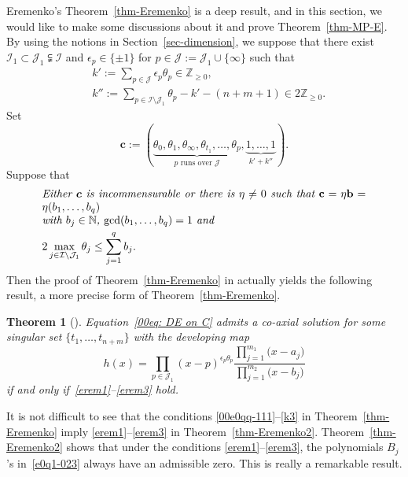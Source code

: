 \documentclass[10pt,a4paper]{amsart}
\numberwithin{equation}{section}
\newtheorem{Theorem}{Theorem}[section]
\begin{document}
Eremenko's Theorem~\ref{thm-Eremenko} is a deep result, and in this section, we would like to make some discussions about it and prove Theorem~\ref{thm-MP-E}.
By using the notions in Section~\ref{sec-dimension}, we suppose that there exist $\mathcal{I}_1\subset \mathcal{J}_1\subsetneqq \mathcal{I}$ and $\epsilon_p\in\{\pm 1\}$ for $p\in\mathcal{J}:=\mathcal{J}_1\cup\{\infty\}$ such that
\begin{align}\label{erem1}
&k':=\sum_{p\in\mathcal{J}}\epsilon_p \theta_p\in\mathbb{Z}_{\geq 0},\\
\label{erem2}
&k'':=\sum_{p\in\mathcal{I}\setminus\mathcal{J}_1}\theta_p-k'-(n+m+1)\in 2\mathbb{Z}_{\geq 0}.
\end{align}
Set
\[
 \boldsymbol c:=(\underbrace{\theta_0,\theta_1,\theta_\infty,
 \theta_{t_1},\dots,\theta_{p}}
 _{p\text{ runs over }\mathcal{J}},\underbrace{1,\dots,1}_{k'+k''}).
\]
Suppose that
\begin{equation} \label{erem3}
\begin{aligned}
& \parbox{\dimexpr\linewidth-5em}{\it
 Either $\boldsymbol c$ is incommensurable or there is $\eta\neq0$
 such that $\mathbf{c}=\eta\mathbf{b}=\eta(b_1,\dots,b_q)$\\ with
 $b_j\in\mathbb{N}$, $\gcd (b_1,\dots,b_q)=1$ and}
\\
& 2\max_{j\in\mathcal{I}\setminus\mathcal{J}_1}\theta_j\leq \sum_{j=1}^q b_j.
\end{aligned}
\end{equation}
Then the proof of Theorem~\ref{thm-Eremenko} in \cite{Coaxial} actually yields the following result, a more precise form of Theorem~\ref{thm-Eremenko}.

\begin{Theorem}[{\cite{Coaxial}\label{thm-Eremenko2}}]
Equation~\eqref{00eq: DE on C} admits a co-axial solution for some singular set $\{t_1,\dots,\allowbreak t_{n+m}\}$ with the developing map
\[h(x)=\prod_{p\in\mathcal{J}_1}(x-p)^{\epsilon_p\theta_p}
\frac{\prod_{j=1}^{m_1}\bigl(x-a_j\bigr)}{\prod_{j=1}^{m_2}\bigl(x-b_j\bigr)}\]
if and only if~\eqref{erem1}--\eqref{erem3} hold.
\end{Theorem}


It is not difficult to see that the conditions
\eqref{00e0qq-111}--\eqref{k3} in Theorem~\ref{thm-Eremenko} imply
\eqref{erem1}--\eqref{erem3} in Theorem~\ref{thm-Eremenko2}. Theorem~\ref{thm-Eremenko2} shows that under the conditions
\eqref{erem1}--\eqref{erem3}, the polynomials $B_j$'s in~\eqref{e0q1-023} always have an admissible zero. This is really a
remarkable result.
\end{document}

